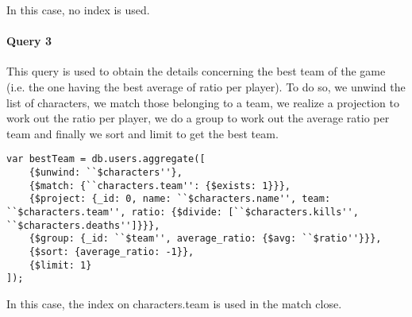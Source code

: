 \documentclass[a4paper, 11pt]{article}
\begin{document}
In this case, no index is used.

\paragraph*{Query 3\\}

This query is used to obtain the details concerning the best team of the game (i.e. the one having the best average of ratio per player).
To do so, we unwind the list of characters, we match those belonging to a team, we realize a projection to work out the ratio per player, we do a group to work out the average ratio per team and finally we sort and limit to get the best team.

\begin{lstlisting}
var bestTeam = db.users.aggregate([
    {$unwind: ``$characters''}, 
    {$match: {``characters.team'': {$exists: 1}}},
    {$project: {_id: 0, name: ``$characters.name'', team: ``$characters.team'', ratio: {$divide: [``$characters.kills'', ``$characters.deaths'']}}},
    {$group: {_id: ``$team'', average_ratio: {$avg: ``$ratio''}}},
    {$sort: {average_ratio: -1}},
    {$limit: 1}
]);
\end{lstlisting}

In this case, the index on characters.team is used in the match close.
\end{document}
